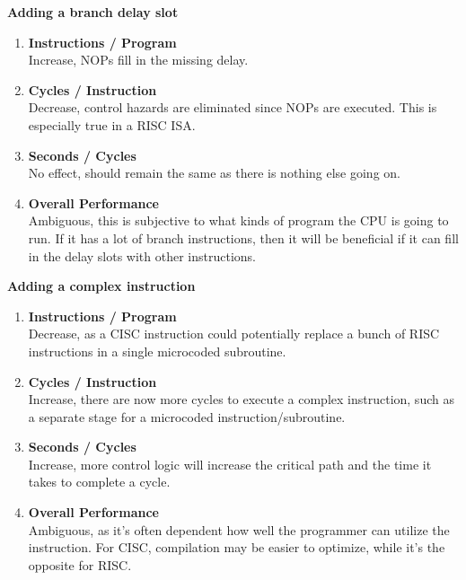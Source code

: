 \documentclass[11pt]{article}
\begin{document}

\begin{Parts}
	\Part \textbf{Adding a branch delay slot}
	\begin{enumerate}[i]
		\item \textbf{Instructions / Program} \\
		      Increase, NOPs fill in the missing delay.
		\item \textbf{Cycles / Instruction} \\
		      Decrease, control hazards are eliminated since NOPs are executed. This is especially true in a RISC ISA.
		\item \textbf{Seconds / Cycles} \\
		      No effect, should remain the same as there is nothing else going on.
		\item \textbf{Overall Performance} \\
		      Ambiguous, this is subjective to what kinds of program the CPU is going to run. If it has a lot of branch instructions, then it will be beneficial if it can fill in the delay slots with other instructions.
	\end{enumerate}
	\Part \textbf{Adding a complex instruction}
	\begin{enumerate}[i]
		\item \textbf{Instructions / Program} \\
		      Decrease, as a CISC instruction could potentially replace a bunch of RISC instructions in a single microcoded subroutine.
		\item \textbf{Cycles / Instruction} \\
		      Increase, there are now more cycles to execute a complex instruction, such as a separate stage for a microcoded instruction/subroutine.
		\item \textbf{Seconds / Cycles} \\
		      Increase, more control logic will increase the critical path and the time it takes to complete a cycle.
		\item \textbf{Overall Performance} \\
		      Ambiguous, as it's often dependent how well the programmer can utilize the instruction. For CISC, compilation may be easier to optimize, while it's the opposite for RISC.
	\end{enumerate}

\end{Parts}
\end{document}
